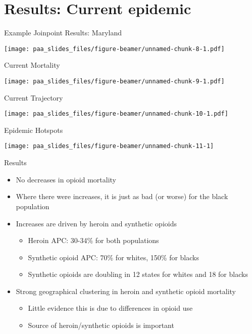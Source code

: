 \documentclass[ignorenonframetext,compress]{beamer}
\providecommand{\tightlist}{%
  \setlength{\itemsep}{0pt}\setlength{\parskip}{0pt}}
\begin{document}
\section{Results: Current epidemic}\label{results-current-epidemic}

\begin{frame}{Example Joinpoint Results: Maryland}

\texttt{[image: paa\_slides\_files/figure-beamer/unnamed-chunk-8-1.pdf]}

\end{frame}

\begin{frame}{Current Mortality}

\texttt{[image: paa\_slides\_files/figure-beamer/unnamed-chunk-9-1.pdf]}

\end{frame}

\begin{frame}{Current Trajectory}

\texttt{[image: paa\_slides\_files/figure-beamer/unnamed-chunk-10-1.pdf]}

\end{frame}

\begin{frame}{Epidemic Hotspots}

\begin{center}\texttt{[image: paa\_slides\_files/figure-beamer/unnamed-chunk-11-1]} \end{center}

\end{frame}

\begin{frame}{Results}

\begin{itemize}[<+->]
\tightlist
\item
  No decreases in opioid mortality
\item
  Where there were increases, it is just as bad (or worse) for the black
  population
\item
  Increases are driven by heroin and synthetic opioids

  \begin{itemize}[<+->]
  \tightlist
  \item
    Heroin APC: 30-34\% for both populations
  \item
    Synthetic opioid APC: 70\% for whites, 150\% for blacks
  \item
    Synthetic opioids are doubling in 12 states for whites and 18 for
    blacks
  \end{itemize}
\item
  Strong geographical clustering in heroin and synthetic opioid
  mortality

  \begin{itemize}[<+->]
  \tightlist
  \item
    Little evidence this is due to differences in opioid use
  \item
    Source of heroin/synthetic opioids is important
  \end{itemize}
\end{itemize}

\end{frame}
\end{document}
